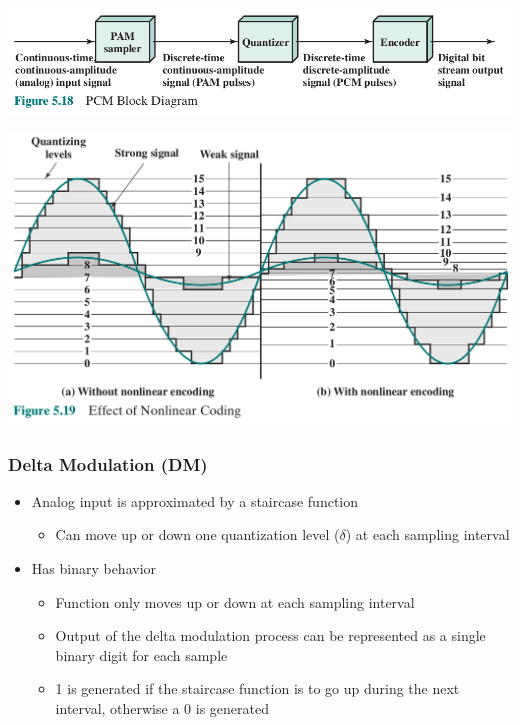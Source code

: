 \documentclass[pdflatex,compress]{beamer}
\begin{document}
\begin{frame}
	\begin{center}
		\includegraphics[width=\linewidth]{img/img25}
	\end{center}
\end{frame}

\begin{frame}
	\begin{center}
		\includegraphics[width=\linewidth]{img/img26}
	\end{center}
\end{frame}

\begin{frame}
	\frametitle{Delta Modulation (DM)}
	\begin{itemize}
		\item Analog input is approximated by a staircase function
		\begin{itemize}
			\item Can move up or down one quantization level ($ \delta $) at each sampling interval
		\end{itemize}
		\item Has binary behavior
		\begin{itemize}
			\item Function only moves up or down at each sampling interval
			\item Output of the delta modulation process can be represented as a single binary digit for each sample
			\item 1 is generated if the staircase function is to go up during the next interval, otherwise a 0 is generated
		\end{itemize}
	\end{itemize}
\end{frame}
\end{document}
